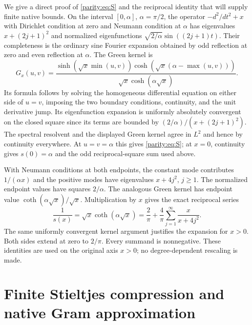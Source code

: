 \documentclass[11pt]{article}
\begin{document}
We give a direct proof of \eqref{parity:eq:S} and the reciprocal identity
that will supply finite native bounds. On the interval
$[0,\alpha]$, $\alpha=\pi/2$, the operator $-d^2/dt^2+x$ with
Dirichlet condition at zero and Neumann condition at $\alpha$
has eigenvalues $x+(2j+1)^2$ and normalized eigenfunctions
$\sqrt{2/\alpha}\sin((2j+1)t)$. Their completeness is the ordinary
sine Fourier expansion obtained by odd reflection at zero and
even reflection at $\alpha$. The Green kernel is
\[
 G_x(u,v)=\frac{\sinh(\sqrt x\min(u,v))
                  \cosh(\sqrt x(\alpha-\max(u,v)))}
                    {\sqrt x\cosh(\alpha\sqrt x)}.
\]
Its formula follows by solving the homogeneous differential
equation on either side of $u=v$, imposing the two boundary
conditions, continuity, and the unit derivative jump. Its
eigenfunction expansion is uniformly absolutely convergent on
the closed square since its terms are bounded by
$(2/\alpha)/(x+(2j+1)^2)$. The spectral resolvent and the displayed
Green kernel agree in $L^2$ and hence by continuity everywhere.
At $u=v=\alpha$ this gives \eqref{parity:eq:S}; at $x=0$, continuity
gives $s(0)=\alpha$ and the odd reciprocal-square sum used above.

With Neumann conditions at both endpoints, the constant mode
contributes $1/(\alpha x)$ and the positive modes have
eigenvalues $x+4j^2$, $j\geq1$. The normalized endpoint values
have squares $2/\alpha$. The analogous Green kernel has endpoint
value $\coth(\alpha\sqrt x)/\sqrt x$. Multiplication by $x$ gives
the exact reciprocal series
\begin{equation}\label{parity:eq:reciprocal}
 \boxed{\frac1{s(x)}=\sqrt x\coth(\alpha\sqrt x)
  =\frac2\pi+\frac4\pi\sum_{j=1}^{\infty}\frac{x}{x+4j^2}.}
\end{equation}
The same uniformly convergent kernel argument justifies the
expansion for $x>0$. Both sides extend at zero to $2/\pi$.
Every summand is nonnegative. These identities are used on the
original axis $x>0$; no degree-dependent rescaling is made.

\section{Finite Stieltjes compression and native Gram approximation}
\end{document}

